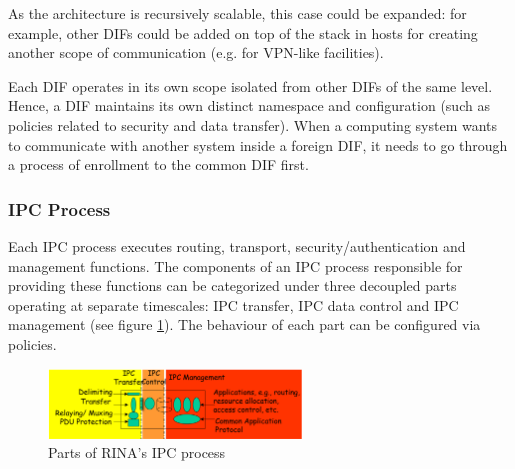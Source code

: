                 As the architecture is recursively scalable, this case could be expanded: for example, other DIFs could be added on top of the stack in hosts for creating another scope of communication (e.g. for VPN-like facilities).

                Each DIF operates in its own scope isolated from other DIFs of the same level. Hence, a DIF maintains its own distinct namespace and configuration (such as policies related to security and data transfer). When a computing system wants to communicate with another system inside a foreign DIF, it needs to go through a process of enrollment to the common DIF first.

            \subsubsection{IPC Process}

                Each IPC process executes routing, transport, security/authentication and management functions. The components of an IPC process responsible for providing these functions can be categorized under three decoupled parts operating at separate timescales: IPC transfer, IPC data control and IPC management (see figure \ref{fig:rina_ipcp}). The behaviour of each part can be configured via policies.

                \begin{figure}[H]
                    \begin{center}
                        \includegraphics[width=0.6\textwidth]{fig/archs_rina-ipcp.png}
                      \caption{Parts of RINA's IPC process}
                      \label{fig:rina_ipcp}
                    \end{center}
                \end{figure}

